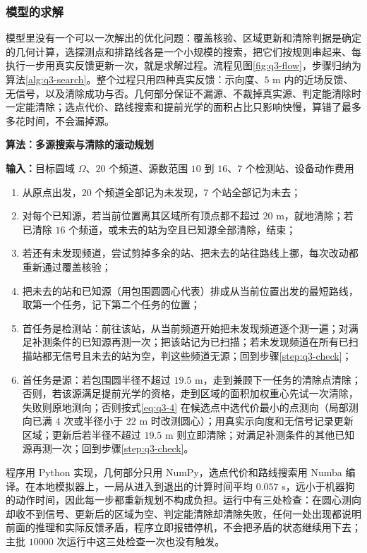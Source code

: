 \subsubsection{模型的求解}\label{sec:q3-3}

模型里没有一个可以一次解出的优化问题：覆盖核验、区域更新和清除判据是确定的几何计算，选探测点和排路线各是一个小规模的搜索，把它们按规则串起来、每执行一步用真实反馈更新一次，就是求解过程。流程见图\ref{fig:q3-flow}，步骤归纳为算法\ref{alg:q3-search}。整个过程只用四种真实反馈：示向度、$5$ m 内的近场反馈、无信号，以及清除成功与否。几何部分保证不漏源、不裁掉真实源、判定能清除时一定能清除；选点代价、路线搜索和提前光学的面积占比只影响快慢，算错了最多多花时间，不会漏掉源。

\begin{center}
\begin{minipage}{\linewidth}
\centering
\QThreeFlowFigure
{}
\label{fig:q3-flow}
\end{minipage}
\end{center}

\par\medskip
\noindent\begin{minipage}{\linewidth}
\small
{}\label{alg:q3-search}
\textbf{算法\thealgorithm：多源搜索与清除的滚动规划}\par\smallskip
\noindent\textbf{输入：}目标圆域 $\Omega$、$20$ 个频道、源数范围 $10$ 到 $16$、$7$ 个检测站、设备动作费用
\begin{enumerate}
\setlength{\itemsep}{2pt}
\setlength{\parskip}{0pt}
\item 从原点出发，$20$ 个频道全部记为未发现，$7$ 个站全部记为未去；
\item\label{step:q3-check} 对每个已知源，若当前位置离其区域所有顶点都不超过 $20$ m，就地清除；若已清除 $16$ 个频道，或未去的站为空且已知源全部清除，结束；
\item 若还有未发现频道，尝试剪掉多余的站、把未去的站往路线上挪，每次改动都重新通过覆盖核验；
\item 把未去的站和已知源（用包围圆圆心代表）排成从当前位置出发的最短路线，取第一个任务，记下第二个任务的位置；
\item 首任务是检测站：前往该站，从当前频道开始把未发现频道逐个测一遍；对满足补测条件的已知源再测一次；把该站记为已扫描；若未发现频道在所有已扫描站都无信号且未去的站为空，判这些频道无源；回到步骤\ref{step:q3-check}；
\item 首任务是源：若包围圆半径不超过 $19.5$ m，走到兼顾下一任务的清除点清除；否则，若该源满足提前光学的资格，走到区域的面积加权重心先试一次清除，失败则原地测向；否则按式\eqref{eq:q3-4} 在候选点中选代价最小的点测向（局部测向已满 $4$ 次或半径小于 $22$ m 时改测圆心）；用真实示向度和无信号记录更新区域；更新后若半径不超过 $19.5$ m 则立即清除；对满足补测条件的其他已知源再测一次；回到步骤\ref{step:q3-check}。
\end{enumerate}
\end{minipage}
\par\medskip

程序用 Python 实现，几何部分只用 NumPy，选点代价和路线搜索用 Numba 编译。在本地模拟器上，一局从进入到退出的计算时间平均 $0.057$ s，远小于机器狗的动作时间，因此每一步都重新规划不构成负担。运行中有三处检查：在圆心测向却收不到信号、更新后的区域为空、判定能清除却清除失败，任何一处出现都说明前面的推理和实际反馈矛盾，程序立即报错停机，不会把矛盾的状态继续用下去；主批 $10000$ 次运行中这三处检查一次也没有触发。
